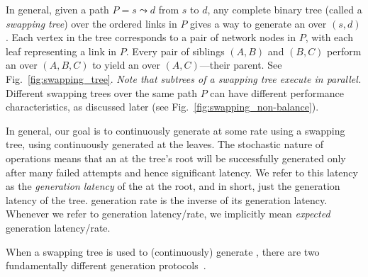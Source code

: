 In general, given a path $P = s \leadsto d$ from $s$ to $d$, 
any complete binary tree (called a \textit{swapping tree}) over 
the ordered links in $P$ gives a way to generate an \eps over $(s, d)$.
Each vertex in the tree corresponds to a pair of network nodes in $P$, 
with each leaf representing a link in $P$. 
Every pair of siblings $(A, B)$ and $(B, C)$ perform an \es over 
$(A,B,C)$  to yield an \eps over $(A,C)$---their parent.
See Fig.~\ref{fig:swapping_tree}. 
\emph{Note that subtrees of a swapping tree execute in parallel.}
Different swapping trees over the same path $P$ can have different performance characteristics, as discussed later (see Fig.~\ref{fig:swapping_non-balance}).

In general, our goal is to continuously generate \epss at some rate using 
a swapping tree, using continuously generated \epss at the leaves. 
The stochastic nature 
of %
\es operations
means that an \eps at the tree's root will be successfully 
generated only after many failed attempts and hence significant latency.
We refer to this latency as the \textit{generation latency} of the \eps at the 
root, and in short, just the generation latency of the tree. 
{\eps generation rate} 
is the inverse of its generation latency. Whenever we refer to generation 
latency/rate, we implicitly mean \textit{expected} generation latency/rate. 

When a swapping tree is used to (continuously) generate \epss, there are two 
fundamentally different generation protocols~\cite{gisin,tittel-08}. 


